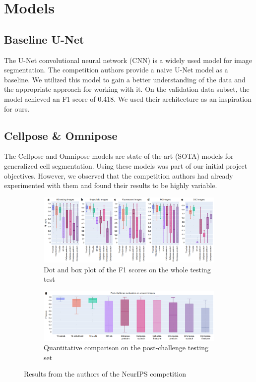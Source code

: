 \documentclass[]{article}
\begin{document}
\section{Models}

\subsection{Baseline U-Net}
The U-Net convolutional neural network (CNN) is a widely used model for image segmentation. The competition authors provide a naive U-Net model as a baseline. We utilized this model to gain a better understanding of the data and the appropriate approach for working with it. On the validation data subset, the model achieved an F1 score of 0.418. We used their architecture as an inspiration for ours.

\subsection{Cellpose \& Omnipose}
The Cellpose and Omnipose models are state-of-the-art (SOTA) models for generalized cell segmentation. Using these models was part of our initial project objectives. However, we observed that the competition authors had already experimented with them and found their results to be highly variable. 
\begin{figure}[!h]
    \centering
    \begin{subfigure}[b]{0.45\textwidth}
        \centering
        \includegraphics[width=\linewidth]{reports/images/cellpose_competition_stains.png}
        \caption{Dot and box plot of the
F1 scores on the whole testing test}
    \end{subfigure}
    \hfill
    \begin{subfigure}[b]{0.45\textwidth}
        \centering
        \includegraphics[width=\linewidth]{reports/images/cellpose_competition_test.png}
        \caption{Quantitative comparison on the post-challenge testing set}
    \end{subfigure}
    \caption{Results from the authors of the NeurIPS competition}
    \label{fig:transformed_images}
\end{figure}
\end{document}
